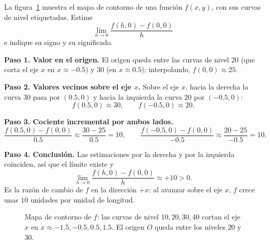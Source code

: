 \begin{prob}
La figura~\ref{fig:contorno_cociente} muestra el mapa de contorno de una
función $f(x,y)$, con sus curvas de nivel etiquetadas. Estime
\[
  \lim_{h\to 0}\frac{f(h,0)-f(0,0)}{h}
\]
e indique su signo y su significado.
\begin{myproof}
\textbf{Paso 1. Valor en el origen.}
El origen queda entre las curvas de nivel $20$ (que corta el eje $x$ en
$x\approx-0.5$) y $30$ (en $x\approx 0.5$); interpolando, $f(0,0)\approx 25$.

\textbf{Paso 2. Valores vecinos sobre el eje $x$.}
Sobre el eje $x$, hacia la derecha la curva $30$ pasa por $(0.5,0)$ y hacia la
izquierda la curva $20$ por $(-0.5,0)$:
\[ f(0.5,0)\approx 30,\qquad f(-0.5,0)\approx 20. \]

\textbf{Paso 3. Cociente incremental por ambos lados.}
\[
  \frac{f(0.5,0)-f(0,0)}{0.5}\approx\frac{30-25}{0.5}=10,\qquad
  \frac{f(-0.5,0)-f(0,0)}{-0.5}\approx\frac{20-25}{-0.5}=10.
\]

\textbf{Paso 4. Conclusión.}
Las estimaciones por la derecha y por la izquierda coinciden, así que el
límite existe y
\[
  \boxed{\ \lim_{h\to 0}\frac{f(h,0)-f(0,0)}{h}\approx +10>0.\ }
\]
Es la razón de cambio de $f$ en la dirección $+x$: al avanzar sobre el eje
$x$, $f$ crece unas $10$ unidades por unidad de longitud.
\end{myproof}
\end{prob}

\begin{figure}[!htbp]
\centering
{}
\caption{Mapa de contorno de $f$: las curvas de nivel $10,20,30,40$ cortan el
  eje $x$ en $x\approx-1.5,-0.5,0.5,1.5$. El origen $O$ queda entre los
  niveles $20$ y $30$.}
\label{fig:contorno_cociente}
\end{figure}

